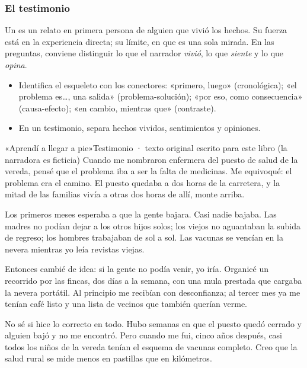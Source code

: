 \subsubsection{El testimonio}
Un  es un relato en primera persona de alguien que vivió los hechos. Su fuerza está en la experiencia
directa; su límite, en que es una sola mirada. En las preguntas, conviene distinguir lo que el narrador \emph{vivió}, lo
que \emph{siente} y lo que \emph{opina}.


\begin{regla}
\begin{itemize}
  \item Identifica el esqueleto con los conectores: «primero, luego» (cronológica); «el problema es…, una salida»
  (problema-solución); «por eso, como consecuencia» (causa-efecto); «en cambio, mientras que» (contraste).
  \item En un testimonio, separa hechos vividos, sentimientos y opiniones.
\end{itemize}
\end{regla}

\begin{texto}{«Aprendí a llegar a pie»}{Testimonio · texto original escrito para este libro (la narradora es ficticia)}
\pa Cuando me nombraron enfermera del puesto de salud de la vereda, pensé que el problema iba a ser la falta de medicinas.
Me equivoqué: el problema era el camino. El puesto quedaba a dos horas de la carretera, y la mitad de las familias vivía a
otras dos horas de allí, monte arriba.

\pa Los primeros meses esperaba a que la gente bajara. Casi nadie bajaba. Las madres no podían dejar a los otros hijos
solos; los viejos no aguantaban la subida de regreso; los hombres trabajaban de sol a sol. Las vacunas se vencían en la
nevera mientras yo leía revistas viejas.

\pa Entonces cambié de idea: si la gente no podía venir, yo iría. Organicé un recorrido por las fincas, dos días a la
semana, con una mula prestada que cargaba la nevera portátil. Al principio me recibían con desconfianza; al tercer mes ya
me tenían café listo y una lista de vecinos que también querían verme.

\pa No sé si hice lo correcto en todo. Hubo semanas en que el puesto quedó cerrado y alguien bajó y no me encontró. Pero
cuando me fui, cinco años después, casi todos los niños de la vereda tenían el esquema de vacunas completo. Creo que la
salud rural se mide menos en pastillas que en kilómetros.
\end{texto}

